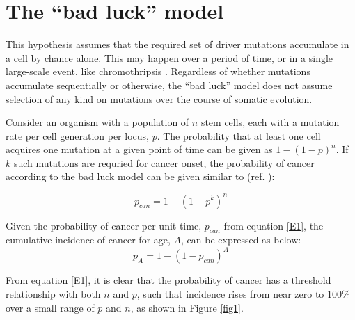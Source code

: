 \documentclass[12pt,onecolumn,twoside]{article}
\begin{document}
\section{The ``bad luck'' model}

This hypothesis assumes that the required set of driver mutations accumulate in a cell by chance alone. This may happen over a period of time, or in a single large-scale event, like chromothripsis \autocite{Stephens2011}. Regardless of whether mutations accumulate sequentially or otherwise, the ``bad luck'' model does not assume selection of any kind on mutations over the course of somatic evolution.

Consider an organism with a population of $n$ stem cells, each with a mutation rate per cell generation per locus, $p$. The probability that at least one cell acquires one mutation at a given point of time can be given as $1-(1-p)^{n}$. If $k$ such mutations are requried for cancer onset, the probability of cancer according to the bad luck model can be given similar to (ref. \cite{Calabrese2010}):

\begin{equation}
	\label{E1}
	p_{can} = 1-(1-p^{k})^{n}
\end{equation}

Given the probability of cancer per unit time, $p_{can}$ from equation \ref{E1}, the cumulative incidence of cancer for age, $A$, can be expressed as below:
\begin{equation}
	\label{E2}
	p_{A} = 1-(1-p_{can})^{A}
\end{equation}

From equation \ref{E1}, it is clear that the probability of cancer has a threshold relationship with both $n$ and $p$, such that incidence rises from near zero to 100\% over a small range of $p$ and $n$, as shown in Figure \ref{fig1}.
\end{document}
